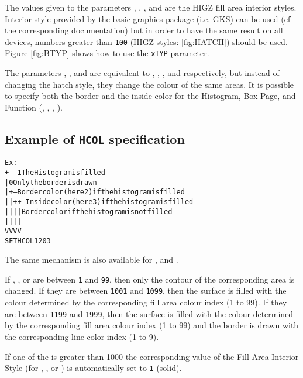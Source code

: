 The values given to the parameters , , ,
and  are the HIGZ fill area interior styles. Interior style
 provided by the basic graphics package (i.e. GKS) can be used (cf the
corresponding documentation) but in order to have the same result on all 
devices, numbers greater than \texttt{100} (HIGZ styles: \ref{fig:HATCH}) should
be used. Figure \ref{fig:BTYP} shows how to use the \texttt{xTYP} parameter. 

The parameters , ,  and 
are equivalent to , , , and 
respectively, but instead of changing the hatch style, they change the
colour of the same areas. It is possible to specify both the border and
the inside color for the Histogram, Box Page, and Function (, 
, , ).
\subsection*{Example of \texttt{HCOL} specification}
\begin{alltt}
      Ex:
                  +---- 1 The Histogram is filled
                  |     0 Only the border is drawn 
                  |+--- Border color (here 2) if the histogram is filled
                  ||++- Inside color (here 3) if the histogram is filled
                  ||||  Border color if the histogram is not filled
                  ||||
                  VVVV
       SET  HCOL  1203  
\end{alltt}
The same mechanism is also available for ,  and 
.

If , ,  or  are between \texttt{1}
and \texttt{99}, then only the contour of the corresponding area is changed. 
If they are between \texttt{1001} and \texttt{1099}, then the surface is filled with
the colour determined by the corresponding fill area colour index (1 to 99).
If they are between \texttt{1199} and \texttt{1999}, then the surface is filled with
the colour determined by the corresponding fill area colour index (1 to 99)
and the border is drawn with the corresponding line color index (1 to 9).

If one of the  is greater than 1000 the corresponding value of the
Fill Area Interior Style (for , ,  or 
) is automatically set to \texttt{1} (solid).

